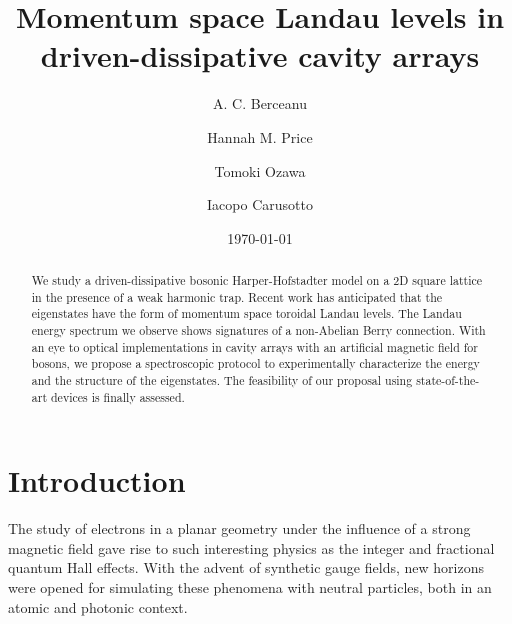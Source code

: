 \documentclass[twocolumn, 10pt, aps, superscriptaddress, floatfix, showpacs, pra, citeautoscript]{revtex4-1}
\newcommand{\co}[2]{#2}
\renewcommand{\paragraph}{\co}
\begin{document}
\title{Momentum space Landau levels in driven-dissipative cavity arrays}


\author{A. C. Berceanu}
\author{Hannah M. Price}
\author{Tomoki Ozawa}
\author{Iacopo Carusotto}

\date{\today}

\begin{abstract}
  We study a driven-dissipative bosonic Harper-Hofstadter model on a
  2D square lattice in the presence of a weak harmonic trap. Recent
  work has anticipated that the eigenstates have the form of momentum
  space toroidal Landau levels. The Landau energy spectrum we observe
  shows signatures of a non-Abelian Berry connection. With an eye to
  optical implementations in cavity arrays with an artificial magnetic
  field for bosons, we propose a spectroscopic protocol to
  experimentally characterize the energy and the structure of the
  eigenstates. The feasibility of our proposal using state-of-the-art
  devices is finally assessed.
\end{abstract}

\maketitle


\section{Introduction}

\paragraph{Quantum magnetism is interesting, even more so in momentum space.}
The study of electrons in a planar geometry under the influence of a
strong magnetic field gave rise to such interesting physics as the
integer and fractional quantum Hall effects. With the advent of
synthetic gauge fields, new horizons were opened for simulating these
phenomena with neutral particles, both in an atomic and photonic
context.
\end{document}

